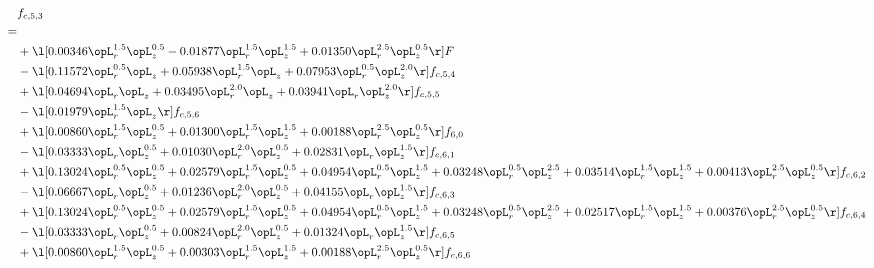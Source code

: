 \begin{alignat}{2} 
\label{eq:f_53_2} 
& f_{c,5,3} \nonumber \\ 
 = \\ 
& + \l[  0.00346 \opL_r^{1.5} \opL_z^{0.5}   -0.01877 \opL_r^{1.5} \opL_z^{1.5} +  0.01350 \opL_r^{2.5} \opL_z^{0.5}  \r] F \nonumber \\ 
& - \l[  0.11572 \opL_r^{0.5} \opL_z +  0.05938 \opL_r^{1.5} \opL_z +  0.07953 \opL_r^{0.5} \opL_z^{2.0}  \r] f_{c,5,4} \nonumber \\ 
& + \l[  0.04694 \opL_r \opL_z +  0.03495 \opL_r^{2.0} \opL_z +  0.03941 \opL_r \opL_z^{2.0}  \r] f_{c,5,5} \nonumber \\ 
& - \l[  0.01979 \opL_r^{1.5} \opL_z  \r] f_{c,5,6} \nonumber \\ 
& + \l[  0.00860 \opL_r^{1.5} \opL_z^{0.5} +  0.01300 \opL_r^{1.5} \opL_z^{1.5} +  0.00188 \opL_r^{2.5} \opL_z^{0.5}  \r] f_{6,0} \nonumber \\ 
& - \l[  0.03333 \opL_r \opL_z^{0.5} +  0.01030 \opL_r^{2.0} \opL_z^{0.5} +  0.02831 \opL_r \opL_z^{1.5}  \r] f_{c,6,1} \nonumber \\ 
& + \l[  0.13024 \opL_r^{0.5} \opL_z^{0.5} +  0.02579 \opL_r^{1.5} \opL_z^{0.5} +  0.04954 \opL_r^{0.5} \opL_z^{1.5} +  0.03248 \opL_r^{0.5} \opL_z^{2.5} +  0.03514 \opL_r^{1.5} \opL_z^{1.5} +  0.00413 \opL_r^{2.5} \opL_z^{0.5}  \r] f_{c,6,2} \nonumber \\ 
& - \l[  0.06667 \opL_r \opL_z^{0.5} +  0.01236 \opL_r^{2.0} \opL_z^{0.5} +  0.04155 \opL_r \opL_z^{1.5}  \r] f_{c,6,3} \nonumber \\ 
& + \l[  0.13024 \opL_r^{0.5} \opL_z^{0.5} +  0.02579 \opL_r^{1.5} \opL_z^{0.5} +  0.04954 \opL_r^{0.5} \opL_z^{1.5} +  0.03248 \opL_r^{0.5} \opL_z^{2.5} +  0.02517 \opL_r^{1.5} \opL_z^{1.5} +  0.00376 \opL_r^{2.5} \opL_z^{0.5}  \r] f_{c,6,4} \nonumber \\ 
& - \l[  0.03333 \opL_r \opL_z^{0.5} +  0.00824 \opL_r^{2.0} \opL_z^{0.5} +  0.01324 \opL_r \opL_z^{1.5}  \r] f_{c,6,5} \nonumber \\ 
& + \l[  0.00860 \opL_r^{1.5} \opL_z^{0.5} +  0.00303 \opL_r^{1.5} \opL_z^{1.5} +  0.00188 \opL_r^{2.5} \opL_z^{0.5}  \r] f_{c,6,6} \nonumber \\ 
\end{alignat} 


